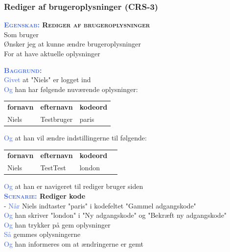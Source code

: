 \subsubsection{Rediger af brugeroplysninger (CRS-3)} \label{sec:USRedigerBruger}
\textbf{\textsc{\textcolor{RoyalBlue}{Egenskab:} Rediger af brugeroplysninger}}\\
Som bruger\\
Ønsker jeg at kunne ændre brugeroplysninger\\
For at have aktuelle oplysninger

\textsc{\textcolor{RoyalBlue}{\textbf{Baggrund:}}}\\
\textcolor{RoyalBlue}{Givet} at "Niels" er logget ind\\
\textcolor{RoyalBlue}{Og} han har følgende nuværende oplysninger:\\
\begin{tabular}{| l | l | l |}
	\textbf{fornavn} & \textbf{efternavn} & \textbf{kodeord} \\
	Niels & Testbruger & paris \\
\end{tabular}
\newline \newline
\textcolor{RoyalBlue}{Og} at han vil ændre indstillingerne til følgende:\\
\begin{tabular}{| l | l | l | l |}
	\textbf{fornavn} & \textbf{efternavn} & \textbf{kodeord} \\
	Niels & TestTest & london \\
\end{tabular}
\newline \newline
\textcolor{RoyalBlue}{Og} at han er navigeret til rediger bruger siden \\

\textbf{\textsc{\textcolor{RoyalBlue}{Scenarie:}} Rediger kode}\\-
\textcolor{RoyalBlue}{Når} Niels indtaster "paris" i kodefeltet "Gammel adgangskode"\\
\textcolor{RoyalBlue}{Og} han skriver "london" i "Ny adgangskode" og "Bekræft ny adgangskode"\\
\textcolor{RoyalBlue}{Og} han trykker på gem oplysninger\\
\textcolor{RoyalBlue}{Så} gemmes oplysningerne\\
\textcolor{RoyalBlue}{Og} han informeres om at ændringerne er gemt \\

